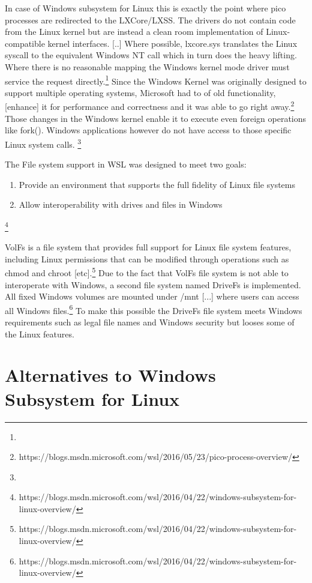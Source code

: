 \documentclass[utf8,biblatex]{lni}
\begin{document}
In case of Windows subsystem for Linux this is exactly the point where pico processes are redirected to the LXCore/LXSS. \glqq The drivers do not contain code from the Linux kernel but are instead a clean room implementation of Linux-compatible kernel interfaces. [..] Where possible, lxcore.sys translates the Linux syscall to the equivalent Windows NT call which in turn does the heavy lifting. Where there is no reasonable mapping the Windows kernel mode driver must service the request directly.\glqq \footnote{} Since the Windows Kernel was originally designed to support multiple operating systems, Microsoft had to \glqq [dust] [...] of old functionality, [enhance] it for performance and correctness and it was able to go right away.\glqq \footnote{https://blogs.msdn.microsoft.com/wsl/2016/05/23/pico-process-overview/} Those changes in the Windows kernel enable it to execute even foreign operations like fork(). Windows applications however do not have access to those specific Linux system calls. \footnote{}

\glqq The File system support in WSL was designed to meet two goals:
\begin{enumerate}
    \item Provide an environment that supports the full fidelity of Linux file systems
    \item Allow interoperability with drives and files in Windows
\end{enumerate}\footnote{https://blogs.msdn.microsoft.com/wsl/2016/04/22/windows-subsystem-for-linux-overview/}

\glqq VolFs is a file system that provides full support for Linux file system features, including Linux permissions that can be modified through operations such as chmod and chroot [etc].\glqq \footnote{https://blogs.msdn.microsoft.com/wsl/2016/04/22/windows-subsystem-for-linux-overview/} Due to the fact that VolFs file system is not able to interoperate with Windows, a second file system named DriveFs is implemented. \glqq All fixed Windows volumes are mounted under /mnt [...] where users can access all Windows files.\glqq \footnote{https://blogs.msdn.microsoft.com/wsl/2016/04/22/windows-subsystem-for-linux-overview/} To make this possible the DriveFs file system meets Windows requirements such as legal file names and Windows security but looses some of the Linux features.

\section{Alternatives to Windows Subsystem for Linux}
\end{document}
